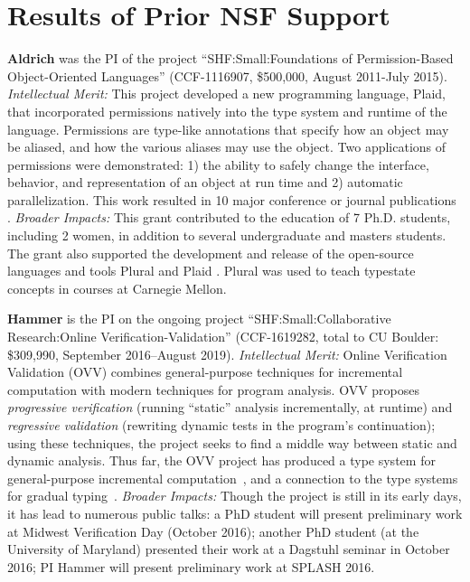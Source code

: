 \vspace{-10px}
\section{Results of Prior NSF Support}

\noindent \textbf{Aldrich} was the PI of the project ``SHF:Small:Foundations of Permission-Based Object-Oriented Languages'' (CCF-1116907, \$500,000, August 2011-July 2015).  \emph{Intellectual Merit:} This project developed a new programming language, Plaid, that incorporated permissions natively into the type system and runtime of the language.  Permissions are type-like annotations that specify how an object may be aliased, and how the various aliases may use the object. Two applications of permissions were demonstrated: 1) the ability to safely change the interface, behavior, and representation of an object at run time and 2) automatic parallelization. This work resulted in 10 major conference or journal publications~
\cite{sunshine11:plaid,
naden12:borrowing,hannesPlural,PradelAPI13,StorkTOPLAS,
nistor14object-propositions,militao14rgprotocols, sunshine14plaiddoc,
garcia14ftop, sunshine15:searching}.
\emph{Broader Impacts:} This grant contributed to the education of 7 Ph.D. 
students, including 2 women, in addition to several undergraduate and masters students.  The grant also supported the development and release of the open-source languages and tools Plural and Plaid \cite{pluraltool,plaidtool}. Plural was used to teach typestate concepts in courses at Carnegie Mellon.

\vspace{0.5ex}
\noindent \textbf{Hammer} is the PI on the ongoing project
``SHF:Small:Collaborative Research:Online Verification-Validation''
(CCF-1619282, total to CU Boulder: \$309,990, September 2016--August
2019).
%
\emph{Intellectual Merit:}
Online Verification Validation (OVV) combines general-purpose
techniques for incremental computation with modern techniques for
program analysis.
%
OVV proposes \emph{progressive verification} (running ``static''
analysis incrementally, at runtime) and \emph{regressive validation}
(rewriting dynamic tests in the program's continuation); using these
techniques, the project seeks to find a middle way between static and
dynamic analysis.
%
%
Thus far, the OVV project has produced a type system for
general-purpose incremental computation~\cite{TypedAdapton2016}, and a
connection to the type systems for gradual
typing~\cite{OVV2016}.
%
\emph{Broader Impacts:} Though the project is still in its early days, it has lead to numerous public talks: a PhD student will present preliminary work at Midwest Verification Day (October 2016); another PhD student (at the University of Maryland) presented their work at a Dagstuhl seminar in October 2016; PI Hammer will present preliminary work at SPLASH 2016.



